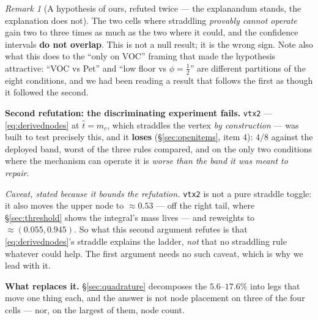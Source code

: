 \documentclass[11pt]{article}
\theoremstyle{remark}
\newtheorem{remark}{Remark}
\begin{document}
\begin{remark}[A hypothesis of ours, refuted twice --- the explanandum stands, the
explanation does not]
The two cells where straddling \emph{provably cannot operate} gain two to three times as
much as the two where it could, and the confidence intervals \textbf{do not overlap}.
This is not a null result; it is the wrong sign. Note also what this does to the ``only
on VOC'' framing that made the hypothesis attractive: ``VOC vs Pet'' and ``low floor vs
$\phi=\tfrac12$'' are different partitions of the eight conditions, and we had been
reading a result that follows the first as though it followed the second.

\textbf{Second refutation: the discriminating experiment fails.} \texttt{vtx2} ---
\eqref{eq:derivednodes} at $\hat t = m_c$, which straddles the vertex \emph{by
construction} --- was built to test precisely this, and it \textbf{loses}
(\S\ref{sec:openitems}, item 4): $4/8$ against the deployed band, worst of the three
rules compared, and on the only two conditions where the mechanism can operate it is
\emph{worse than the band it was meant to repair}.

\emph{Caveat, stated because it bounds the refutation.} \texttt{vtx2} is not a pure
straddle toggle: it also moves the upper node to $\approx 0.53$ --- off the right tail,
where \S\ref{sec:threshold} shows the integral's mass lives --- and reweights to
$\approx(0.055, 0.945)$. So what this second argument refutes is that
\eqref{eq:derivednodes}'s straddle explains the ladder, \emph{not} that no straddling
rule whatever could help. The first argument needs no such caveat, which is why we lead
with it.

\textbf{What replaces it.} \S\ref{sec:quadrature} decomposes the $5.6$--$17.6\%$ into
legs that move one thing each, and the answer is not node placement on three of the four
cells --- nor, on the largest of them, node count.
\end{remark}
\end{document}
